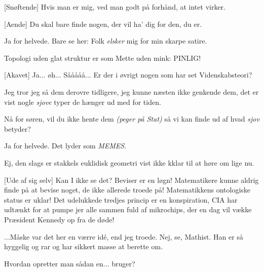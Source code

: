 \documentclass[a4paper,11pt]{article}
\begin{document}
\begin{sketch}
[Snøftende] Hvis man er mig, ved man godt på forhånd, at intet virker.

[Aende] Du skal bare finde nogen, der vil ha' dig for den, du er.

 Ja for helvede. Bare se her: Folk \emph{elsker} mig for min skarpe satire.


 Topologi uden glat struktur er som Mette uden mink: PINLIG!

[Akavet] Ja... øh... Sååååå... Er der i øvrigt nogen som har set Videnskabsteori?

 Jeg tror jeg så dem derovre tidligere, jeg kunne næsten ikke genkende dem, det er vist nogle \emph{sjove} typer de hænger ud med for tiden.

 Nå for søren, vil du ikke hente dem \emph{(peger på Stat)} så vi kan finde ud af hvad \emph{sjov} betyder?

 Ja for helvede. Det lyder som \emph{MEMES}.

 Ej, den slags er stakkels euklidisk geometri vist ikke kklar til at høre om lige nu.


[Ude af sig selv] Kan I ikke se det? Beviser er en løgn! Matematikere kunne aldrig finde på at bevise noget, de ikke allerede troede på! Matematikkens ontologiske status er uklar! Det udelukkede tredjes princip er en konspiration, CIA har udtænkt for at pumpe jer alle sammen fuld af mikrochips, der en dag vil vække Præsident Kennedy op fra de døde!

 ...Måske var det her en værre idé, end jeg troede. Nej, se, Mathist. Han er så hyggelig og rar og har sikkert masse at berette om.


 Hvordan opretter man sådan en... bruger?

\end{sketch}
\end{document}
